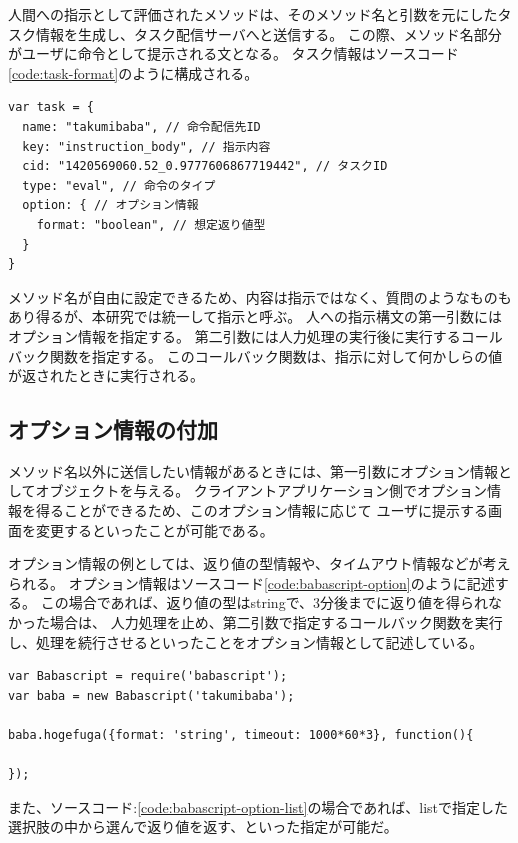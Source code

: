 人間への指示として評価されたメソッドは、そのメソッド名と引数を元にしたタスク情報を生成し、タスク配信サーバへと送信する。
この際、メソッド名部分がユーザに命令として提示される文となる。
タスク情報はソースコード\ref{code:task-format}のように構成される。

\begin{lstlisting}[caption=タスク情報の例, label=code:task-format]
var task = {
  name: "takumibaba", // 命令配信先ID
  key: "instruction_body", // 指示内容
  cid: "1420569060.52_0.9777606867719442", // タスクID
  type: "eval", // 命令のタイプ
  option: { // オプション情報
    format: "boolean", // 想定返り値型
  }
}
\end{lstlisting}

メソッド名が自由に設定できるため、内容は指示ではなく、質問のようなものもあり得るが、本研究では統一して指示と呼ぶ。
人への指示構文の第一引数にはオプション情報を指定する。
第二引数には人力処理の実行後に実行するコールバック関数を指定する。
このコールバック関数は、指示に対して何かしらの値が返されたときに実行される。

\subsection{オプション情報の付加}\label{ux30aaux30d7ux30b7ux30e7ux30f3ux60c5ux5831ux306eux4ed8ux52a0}

メソッド名以外に送信したい情報があるときには、第一引数にオプション情報としてオブジェクトを与える。
クライアントアプリケーション側でオプション情報を得ることができるため、このオプション情報に応じて
ユーザに提示する画面を変更するといったことが可能である。

オプション情報の例としては、返り値の型情報や、タイムアウト情報などが考えられる。
オプション情報はソースコード\ref{code:babascript-option}のように記述する。
この場合であれば、返り値の型はstringで、3分後までに返り値を得られなかった場合は、
人力処理を止め、第二引数で指定するコールバック関数を実行し、処理を続行させるといったことをオプション情報として記述している。

\begin{lstlisting}[caption=オプション情報のサンプルソースコードその1, label=code:babascript-option]
var Babascript = require('babascript');
var baba = new Babascript('takumibaba');

baba.hogefuga({format: 'string', timeout: 1000*60*3}, function(){

});
\end{lstlisting}

また、ソースコード:\ref{code:babascript-option-list}の場合であれば、listで指定した選択肢の中から選んで返り値を返す、といった指定が可能だ。


